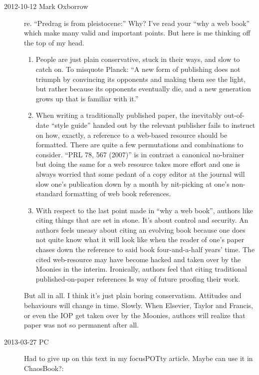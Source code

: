 \begin{description}
\item[2012-10-12 Mark Oxborrow] re. ``Predrag is from pleistocene:''
Why? I've read your ``why a web book'' which make many valid and
important points. But here is me thinking off the top of my head.
\begin{enumerate}
    \item
People are just plain conservative, stuck in their ways, and slow to
catch on.  To misquote Planck: ``A new form of publishing does not
triumph by convincing its opponents and making them see the light, but
rather because its opponents eventually die, and a new generation grows
up that is familiar with it.''
    \item
When writing a traditionally published paper, the inevitably out-of-date
``style guide'' handed out by the relevant publisher fails to instruct on
how, exactly, a reference to a web-based resource should be formatted.
There are quite a few permutations and combinations to consider. ``PRL
78, 567 (2007)'' is in contrast a canonical no-brainer but doing the same
for a web resource takes more effort and one is always worried that some
pedant of a copy editor at the journal will slow one's publication down
by a month by nit-picking at one's non-standard formatting of web book
references.
    \item
With respect to the last point made in ``why a web book'', authors like
citing things that are set in stone. It's about control and security. An
authors feels uneasy about citing an evolving book because one does not
quite know what it will look like when the reader of one's paper chases
down the reference to said book four-and-a-half years' time.  The cited
web-resource may have become hacked and taken over by the Moonies in the
interim.  Ironically, authors feel that citing traditional
published-on-paper references Is way of future proofing their work.
\end{enumerate}
But all in all. I think it's just plain boring conservatism. Attitudes
and behaviours will change in time. Slowly. When Elsevier, Taylor and
Francis, or even the IOP get taken over by the Moonies, authors will
realize that paper was not so permanent after all.

\item[2013-03-27 PC] Had to give up on
this text in my focusPOTty article. Maybe can use it in
ChaosBook?:


\end{description}
